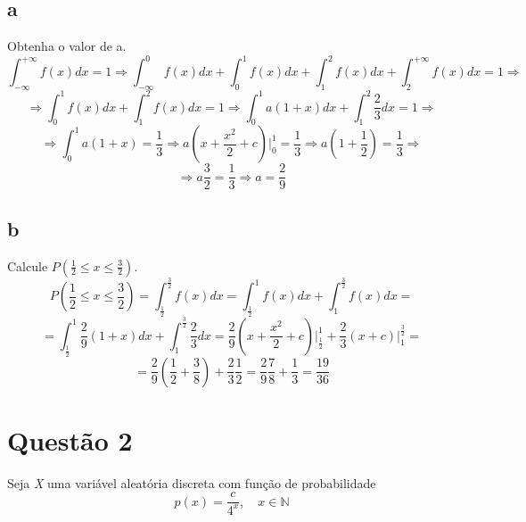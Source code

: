 \documentclass{article}[twocolumn]
\begin{document}
	\subsection{a}
	Obtenha o valor de a.
	\begin{equation}
		\int_{-\infty}^{+\infty}f(x)dx = 1 \Rightarrow
		\int_{-\infty}^{0}f(x)dx + \int_{0}^{1}f(x)dx +
		\int_{1}^{2}f(x)dx + \int_{2}^{+\infty}f(x)dx = 1 \Rightarrow
		\nonumber
	\end{equation}
	\begin{equation}
		\Rightarrow \int_{0}^{1}f(x)dx + \int_{1}^{2}f(x)dx = 1 \Rightarrow
		\int_{0}^{1}a(1 + x)dx + \int_{1}^{2}\frac{2}{3}dx = 1 \Rightarrow
		\nonumber
	\end{equation}
	\begin{equation}
		\Rightarrow
		\int_{0}^{1}a(1 + x) = \frac{1}{3} \Rightarrow
		a(x + \frac{x^{2}}{2} + c) \big|_{0}^{1} = \frac{1}{3} \Rightarrow
		a(1 + \frac{1}{2}) = \frac{1}{3}\Rightarrow
		\nonumber
	\end{equation}
	\begin{equation}
		\Rightarrow
		a\frac{3}{2} = \frac{1}{3} \Rightarrow
		a = \frac{2}{9}
		\nonumber
	\end{equation}
	\subsection{b}
	Calcule $P\left(\frac{1}{2} \leq x \leq \frac{3}{2}\right)$.
	\begin{equation}
		P\left(\frac{1}{2} \leq x \leq \frac{3}{2}\right) =
		\int_{\frac{1}{2}}^{\frac{3}{2}}f(x)dx =
		\int_{\frac{1}{2}}^{1}f(x)dx + \int_{1}^{\frac{3}{2}}f(x)dx =
		\nonumber
	\end{equation}
	\begin{equation}
		= \int_{\frac{1}{2}}^{1}\frac{2}{9}(1 + x)dx + \int_{1}^{\frac{3}{2}}\frac{2}{3}dx
		= \frac{2}{9}(x + \frac{x^{2}}{2} + c)\big|_{\frac{1}{2}}^{1} +
		\frac{2}{3}(x + c)\big|_{1}^{\frac{3}{2}} =
		\nonumber
	\end{equation}
	\begin{equation}
		= \frac{2}{9}(\frac{1}{2} + \frac{3}{8}) + \frac{2}{3}\frac{1}{2} =
		\frac{2}{9}\frac{7}{8} + \frac{1}{3} = \frac{19}{36}
		\nonumber
	\end{equation}
	\newpage
	\section{Quest\~ao 2}
	Seja \textit{X} uma vari\'avel aleat\'oria discreta com fun\c{c}\~ao de probabilidade
	\begin{equation}
		p(x) = \frac{c}{4^{x}}, \quad x \in \mathbb{N}
		\nonumber
	\end{equation}
\end{document}
